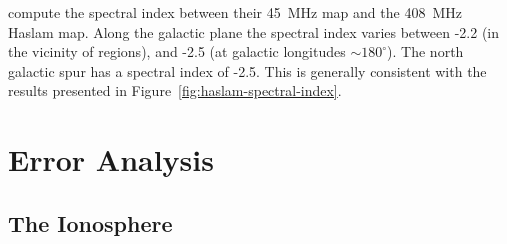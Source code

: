 \documentclass[twocolumn]{aastex61}
\begin{document}
\citet{2011A&A...525A.138G} compute the spectral index between their 45~MHz map and the 408~MHz
Haslam map. Along the galactic plane the spectral index varies between -2.2 (in the vicinity of
 regions), and -2.5 (at galactic longitudes $\sim 180^\circ$). The north galactic spur has
a spectral index of -2.5. This is generally consistent with the results presented in
Figure~\ref{fig:haslam-spectral-index}.

\section{Error Analysis}\label{sec:error}

\subsection{The Ionosphere}\label{sec:ionosphere}
\end{document}
